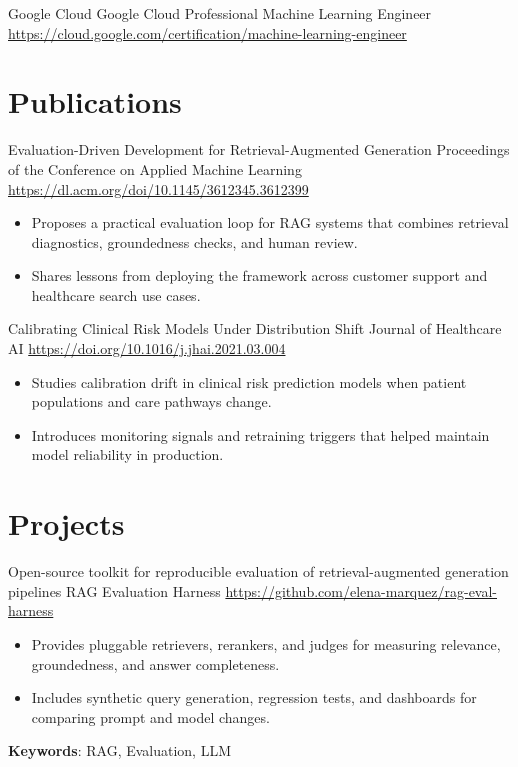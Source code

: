 \documentclass[a4paper, serif, 10pt]{moderncv}
\begin{document}
        {Google Cloud}
        {Google Cloud Professional Machine Learning Engineer}
        {\url{https://cloud.google.com/certification/machine-learning-engineer}}
        {}
        {}
\section{Publications}

        {Evaluation-Driven Development for Retrieval-Augmented Generation}
        {Proceedings of the Conference on Applied Machine Learning}
        {\url{https://dl.acm.org/doi/10.1145/3612345.3612399}}
        {}
        {\begin{itemize}
\item Proposes a practical evaluation loop for RAG systems that combines retrieval diagnostics, groundedness checks, and human review.
\item Shares lessons from deploying the framework across customer support and healthcare search use cases.
\end{itemize}}

        {Calibrating Clinical Risk Models Under Distribution Shift}
        {Journal of Healthcare AI}
        {\url{https://doi.org/10.1016/j.jhai.2021.03.004}}
        {}
        {\begin{itemize}
\item Studies calibration drift in clinical risk prediction models when patient populations and care pathways change.
\item Introduces monitoring signals and retraining triggers that helped maintain model reliability in production.
\end{itemize}}
\section{Projects}

        {Open-source toolkit for reproducible evaluation of retrieval-augmented generation pipelines}
        {RAG Evaluation Harness}
        {\url{https://github.com/elena-marquez/rag-eval-harness}}
        {}
        {\begin{itemize}
\item Provides pluggable retrievers, rerankers, and judges for measuring relevance, groundedness, and answer completeness.
\item Includes synthetic query generation, regression tests, and dashboards for comparing prompt and model changes.
\end{itemize}
\textbf{Keywords}: RAG, Evaluation, LLM}
\end{document}
